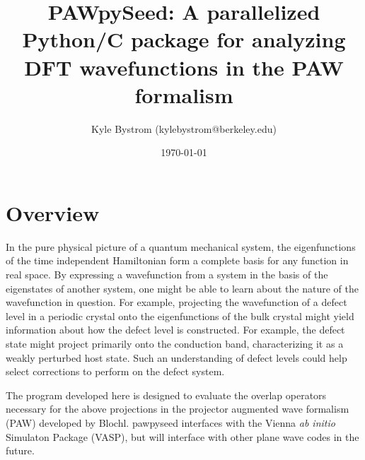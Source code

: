 \documentclass[12pt]{article}
\begin{document}
\newcommand{\ind}{lm\epsilon}

\title{PAWpySeed: A parallelized Python/C package for analyzing
DFT wavefunctions in the PAW formalism}
\author[1]{Kyle Bystrom (kylebystrom@berkeley.edu)}
\date{\today}
\maketitle
{}

\section{Overview}

In the pure physical picture of a quantum mechanical system, the eigenfunctions of the time
independent Hamiltonian form a complete basis for any function in real space. By expressing
a wavefunction from a system in the basis of the eigenstates of another system, one might
be able to learn about the nature of the wavefunction in question. For example, projecting
the wavefunction of a defect level in a periodic crystal onto the eigenfunctions of the
bulk crystal might yield information about how the defect level is constructed. For example,
the defect state might project primarily onto the conduction band, characterizing it
as a weakly perturbed host state. Such an understanding of defect levels could help select
corrections to perform on the defect system.\cite{lany}

The program developed here is designed to evaluate the overlap operators necessary for the
above projections in the projector augmented wave formalism (PAW) developed by Blochl.\cite{blochl}
pawpyseed interfaces with the Vienna \emph{ab initio} Simulaton
Package (VASP)\cite{vasp,vasp1,vasp2,vasp3,vasp4}, but will interface with other plane wave
codes in the future.
\end{document}
